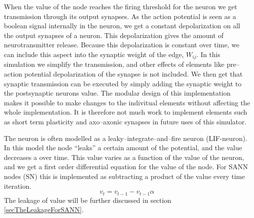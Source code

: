 	When the value of the node reaches the firing threshold for the neuron we get transmission through its output synapses.
	As the action potential is seen as a boolean signal internally in the neuron, we get a constant depolarization on all the output synapses of a neuron.
	This depolarization gives the amount of neurotransmitter release. 
	Because this depolarization is constant over time, we can include this aspect into the synaptic weight of the edge, $W_{ij}$.
	In this simulation we simplify the transmission, and other effects of elements like pre--action potential depolarization of the synapse is not included.%
	We then get that synaptic transmission can be executed by simply adding the synaptic weight to the postsynaptic neurons value.
	The modular design of this implementation makes it possible to make changes to the indivitual elements without affecting the whole implementation.
	It is therefore not much work to implement elements such as short term plasticity and axo--axonic synapses in future uses of this simulator.

	The neuron is
					 often modelled as a leaky--integrate--and--fire neuron (LIF-neuron). %
	In this model the node ``leaks'' a certain amount of the potential, and the value decreases a over time. 
	This value varies as a function of the value of the neuron, and we get a first order differential equation for the value of the node.
	For SANN nodes (SN) this is implemented as subtracting a product of the value every time iteration. 
	\begin{equation}
	v_t = v_{t-1} - v_{t-1}  \alpha %
	\end{equation}
	The leakage of value will be further discussed in section \ref{secTheLeakageForSANN}.

